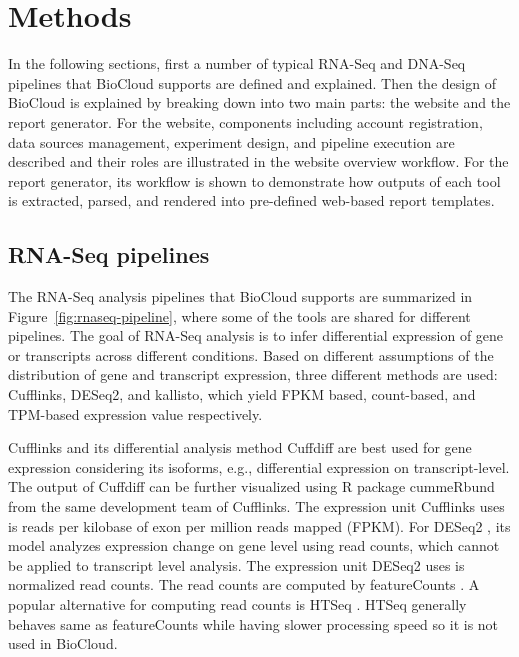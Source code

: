 \chapter{Methods}
\label{c:method}

In the following sections, first a number of typical RNA-Seq and DNA-Seq
pipelines that BioCloud supports are defined and explained. Then the design of
BioCloud is explained by breaking down into two main parts: the website and the
report generator. For the website, components including account registration,
data sources management, experiment design, and pipeline execution are
described and their roles are illustrated in the website overview workflow. For
the report generator, its workflow is shown to demonstrate how outputs of each
tool is extracted, parsed, and rendered into pre-defined web-based report
templates.



\section{RNA-Seq pipelines}
\label{s:rnaseq-pipeline}

The RNA-Seq analysis pipelines that BioCloud supports are summarized in
Figure~\ref{fig:rnaseq-pipeline}, where some of the tools are shared for
different pipelines. The goal of RNA-Seq analysis is to infer differential
expression of gene or transcripts across different conditions. Based on
different assumptions of the distribution of gene and transcript expression,
three different methods are used: Cufflinks, DESeq2, and kallisto, which yield
FPKM based, count-based, and TPM-based expression value respectively.



Cufflinks \cite{trapnell2010:transcript} and its differential analysis method
Cuffdiff \cite{trapnell2013:differential} are best used for gene expression
considering its isoforms, e.g., differential expression on transcript-level.
The output of Cuffdiff can be further visualized using R package cummeRbund
\cite{:cummerbund} from the same development team of Cufflinks. The expression
unit Cufflinks uses is reads per kilobase of exon per million reads mapped
(FPKM). For DESeq2 \cite{love2014:moderated}, its model analyzes expression
change on gene level using read counts, which cannot be applied to transcript
level analysis. The expression unit DESeq2 uses is normalized read counts. The
read counts are computed by featureCounts \cite{liao2014:featurecounts}. A
popular alternative for computing read counts is HTSeq
\cite{anders2015:htseqa}. HTSeq generally behaves same as featureCounts while
having slower processing speed so it is not used in BioCloud.

